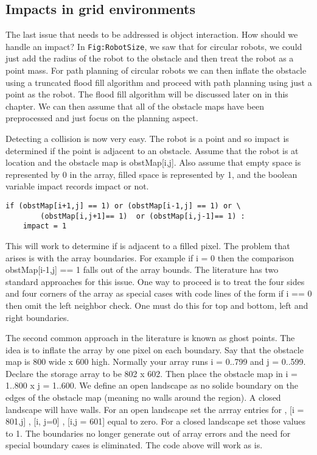 \hypertarget{impacts-in-grid-environments}{%
\subsection{Impacts in grid
environments}\label{impacts-in-grid-environments}}

The last issue that needs to be addressed is object interaction. How
should we handle an impact? In \texttt{Fig:RobotSize}, we saw that for
circular robots, we could just add the radius of the robot to the
obstacle and then treat the robot as a point mass. For path planning of
circular robots we can then inflate the obstacle using a truncated flood
fill algorithm and proceed with path planning using just a point as the
robot. The flood fill algorithm will be discussed later on in this
chapter. We can then assume that all of the obstacle maps have been
preprocessed and just focus on the planning aspect.

Detecting a collision is now very easy. The robot is a point and so
impact is determined if the point is adjacent to an obstacle. Assume
that the robot is at location and the obstacle map is obstMap{[}i,j{]}.
Also assume that empty space is represented by 0 in the array, filled
space is represented by 1, and the boolean variable impact records
impact or not.

\begin{verbatim}
if (obstMap[i+1,j] == 1) or (obstMap[i-1,j] == 1) or \
        (obstMap[i,j+1]== 1)  or (obstMap[i,j-1]== 1) :
    impact = 1
\end{verbatim}

This will work to determine if is adjacent to a filled pixel. The
problem that arises is with the array boundaries. For example if i = 0
then the comparison obstMap{[}i-1,j{]} == 1 falls out of the array
bounds. The literature has two standard approaches for this issue. One
way to proceed is to treat the four sides and four corners of the array
as special cases with code lines of the form if i == 0 then omit the
left neighbor check. One must do this for top and bottom, left and right
boundaries.

The second common approach in the literature is known as ghost points.
The idea is to inflate the array by one pixel on each boundary. Say that
the obstacle map is 800 wide x 600 high. Normally your array runs i =
0..799 and j = 0..599. Declare the storage array to be 802 x 602. Then
place the obstacle map in i = 1..800 x j = 1..600. We define an open
landscape as no solide boundary on the edges of the obstacle map
(meaning no walls around the region). A closed landscape will have
walls. For an open landscape set the arrray entries for , {[}i =
801,j{]} , {[}i, j=0{]} , {[}i,j = 601{]} equal to zero. For a closed
landscape set those values to 1. The boundaries no longer generate out
of array errors and the need for special boundary cases is eliminated.
The code above will work as is.

